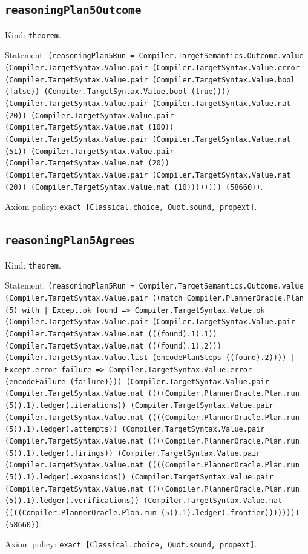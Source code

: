 \documentclass[11pt]{article}
\begin{document}
\subsection*{\texttt{reasoningPlan5Outcome}}
\noindent Kind: \texttt{theorem}.\par
\noindent Statement: \texttt{(reasoningPlan5Run = Compiler.TargetSemantics.Outcome.value (Compiler.TargetSyntax.Value.pair (Compiler.TargetSyntax.Value.error (Compiler.TargetSyntax.Value.pair (Compiler.TargetSyntax.Value.bool (false)) (Compiler.TargetSyntax.Value.bool (true)))) (Compiler.TargetSyntax.Value.pair (Compiler.TargetSyntax.Value.nat (20)) (Compiler.TargetSyntax.Value.pair (Compiler.TargetSyntax.Value.nat (100)) (Compiler.TargetSyntax.Value.pair (Compiler.TargetSyntax.Value.nat (51)) (Compiler.TargetSyntax.Value.pair (Compiler.TargetSyntax.Value.nat (20)) (Compiler.TargetSyntax.Value.pair (Compiler.TargetSyntax.Value.nat (20)) (Compiler.TargetSyntax.Value.nat (10)))))))) (58660))}.\par
\noindent Axiom policy: \texttt{exact [Classical.choice, Quot.sound, propext]}.\par
\subsection*{\texttt{reasoningPlan5Agrees}}
\noindent Kind: \texttt{theorem}.\par
\noindent Statement: \texttt{(reasoningPlan5Run = Compiler.TargetSemantics.Outcome.value (Compiler.TargetSyntax.Value.pair ((match Compiler.PlannerOracle.Plan (5) with | Except.ok found => Compiler.TargetSyntax.Value.ok (Compiler.TargetSyntax.Value.pair (Compiler.TargetSyntax.Value.pair (Compiler.TargetSyntax.Value.nat (((found).1).1)) (Compiler.TargetSyntax.Value.nat (((found).1).2))) (Compiler.TargetSyntax.Value.list (encodePlanSteps ((found).2)))) | Except.error failure => Compiler.TargetSyntax.Value.error (encodeFailure (failure)))) (Compiler.TargetSyntax.Value.pair (Compiler.TargetSyntax.Value.nat ((((Compiler.PlannerOracle.Plan.run (5)).1).ledger).iterations)) (Compiler.TargetSyntax.Value.pair (Compiler.TargetSyntax.Value.nat ((((Compiler.PlannerOracle.Plan.run (5)).1).ledger).attempts)) (Compiler.TargetSyntax.Value.pair (Compiler.TargetSyntax.Value.nat ((((Compiler.PlannerOracle.Plan.run (5)).1).ledger).firings)) (Compiler.TargetSyntax.Value.pair (Compiler.TargetSyntax.Value.nat ((((Compiler.PlannerOracle.Plan.run (5)).1).ledger).expansions)) (Compiler.TargetSyntax.Value.pair (Compiler.TargetSyntax.Value.nat ((((Compiler.PlannerOracle.Plan.run (5)).1).ledger).verifications)) (Compiler.TargetSyntax.Value.nat ((((Compiler.PlannerOracle.Plan.run (5)).1).ledger).frontier)))))))) (58660))}.\par
\noindent Axiom policy: \texttt{exact [Classical.choice, Quot.sound, propext]}.\par
\end{document}
